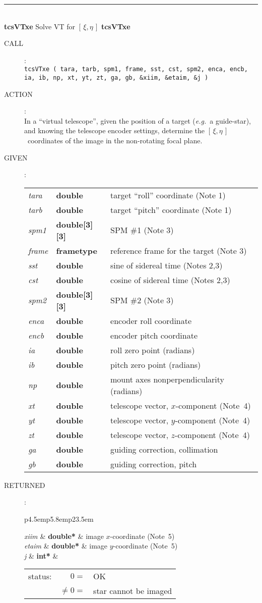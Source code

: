 \documentclass[12pt,fleqn,twoside]{article}
\renewcommand{\_}{{\tt\char'137}}     %
\newcommand{\xieta}     {$[\,\xi,\eta\,]$}
\newcommand{\routine}[2]
{
  \newpage
  \rule{\textwidth}{0.3mm}\\ \nopagebreak
  {\Large {\bf #1} \hfill #2 \hfill {\bf #1}}
  \vspace{-1ex}
}
\newcommand{\call}[1]
{
  \goodbreak
  \begin{description}
    \item[CALL]: \\[0.5ex] \nopagebreak
        {\tt #1}
  \end{description}
  \vspace{-3ex}
}
\newcommand{\action}[1]
{
  \goodbreak
  \begin{description}
    \item[ACTION]: \\[0.5ex] \nopagebreak
        #1
  \end{description}
  \vspace{-3ex}
}
\newcommand{\args}[2]
{
  \goodbreak
  \begin{description}
  \item[#1]: \\[1.5ex] \nopagebreak
    \hspace*{-0.9em}
    \begin{tabular}{p{4.5em}p{5.8em}p{23.5em}}
      #2
    \end{tabular}
  \end{description}
  \vspace{-3ex}
}
\newcommand{\spec}[3]
{
  {\em {#1}} & {\bf \mbox{#2}} & {#3}
}
\begin{document}
\routine{tcsVTxe}{Solve VT for \xieta}
\label{tcsVTxe}
\call{tcsVTxe ( tara, tarb, spm1, frame, sst, cst, spm2, enca, encb, \\
\hspace*{4.5em} ia, ib, np, xt, yt, zt, ga, gb, \&xiim, \&etaim, \&j ) }
\action{In a ``virtual telescope'', given the
        position of a target ({\it e.g.}~a
        guide-star), and knowing the telescope encoder settings, determine
        the \xieta\ coordinates of the image in the non-rotating focal
        plane.}
\args{GIVEN}
{
\spec{tara}{double}{target ``roll'' coordinate (Note 1)} \\
\spec{tarb}{double}{target ``pitch'' coordinate (Note 1)} \\
\spec{spm1}{double[3][3]}{SPM \#1 (Note 3)} \\
\spec{frame}{{\sc frametype}}{reference frame for the target (Note 3)} \\
\spec{sst}{double}{sine of sidereal time (Notes 2,3)} \\
\spec{cst}{double}{cosine of sidereal time (Notes 2,3)} \\
\spec{spm2}{double[3][3]}{SPM \#2 (Note 3)} \\
\spec{enca}{double}{encoder roll coordinate} \\
\spec{encb}{double}{encoder pitch coordinate} \\
\spec{ia}{double}{roll zero point (radians)} \\
\spec{ib}{double}{pitch zero point (radians)} \\
\spec{np}{double}{mount axes nonperpendicularity (radians)} \\
\spec{xt}{double}{telescope vector, $x$-component (Note~4)} \\
\spec{yt}{double}{telescope vector, $y$-component (Note~4)} \\
\spec{zt}{double}{telescope vector, $z$-component (Note~4)} \\
\spec{ga}{double}{guiding correction, collimation} \\
\spec{gb}{double}{guiding correction, pitch}
}
\args{RETURNED}
{
\spec{xiim }{double*}{image $x$-coordinate (Note~5)} \\
\spec{etaim}{double*}{image $y$-coordinate (Note~5)} \\
\spec{j}{int*}{\hspace{-2ex}
               \begin{tabular}[t]{lrl}
                  status: & $  0 = $ & OK \\
                          & $ \neq 0 = $ & star cannot be imaged
               \end{tabular}
              }
}
\end{document}
